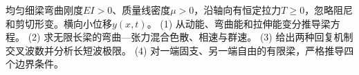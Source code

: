 均匀细梁弯曲刚度\(EI>0\)、质量线密度\(\mu>0\)，沿轴向有恒定拉力\(T\ge0\)，忽略阻尼和剪切形变。横向小位移\(y(x,t)\)。
(1) 从动能、弯曲能和拉伸能变分推导梁方程。
(2) 求无限长梁的弯曲—张力混合色散、相速与群速。
(3) 给出两种回复机制交叉波数并分析长短波极限。
(4) 对一端固支、另一端自由的有限梁，严格推导四个边界条件。
